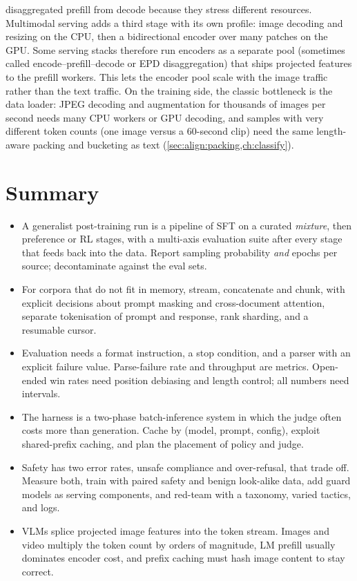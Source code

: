 \begin{systemslens}
 disaggregated prefill from decode because they stress different resources.
Multimodal serving adds a third stage with its own profile: image decoding and resizing on the
CPU, then a bidirectional encoder over many patches on the GPU. Some serving stacks therefore
run encoders as a separate pool (sometimes called encode--prefill--decode or EPD disaggregation)
that ships projected features to the prefill workers. This lets the encoder pool scale with the image traffic
rather than the text traffic. On the training side, the classic bottleneck is the data loader:
JPEG decoding and augmentation for thousands of images per second needs many CPU workers or
GPU decoding, and samples with very different token counts (one image versus a 60-second clip)
need the same length-aware packing and bucketing as text (\cref{sec:align:packing,ch:classify}).
\end{systemslens}

\section{Summary}\label{sec:align:summary}
\begin{itemize}
  \item A generalist post-training run is a pipeline of SFT on a curated \emph{mixture}, then
        preference or RL stages, with a multi-axis evaluation suite after every stage that feeds back
        into the data. Report sampling probability \emph{and} epochs per source; decontaminate
        against the eval sets.
  \item For corpora that do not fit in memory, stream, concatenate and chunk, with explicit
        decisions about prompt masking and cross-document attention, separate tokenisation of prompt
        and response, rank sharding, and a resumable cursor.
  \item Evaluation needs a format instruction, a stop condition, and a parser with an explicit
        failure value. Parse-failure rate and throughput are metrics. Open-ended win rates need
        position debiasing and length control; all numbers need intervals.
  \item The harness is a two-phase batch-inference system in which the judge often costs more
        than generation. Cache by (model, prompt, config), exploit shared-prefix caching, and plan
        the placement of policy and judge.
  \item Safety has two error rates, unsafe compliance and over-refusal, that trade off. Measure
        both, train with paired safety and benign look-alike data, add guard models as serving
        components, and red-team with a taxonomy, varied tactics, and logs.
  \item VLMs splice projected image features into the token stream. Images and video multiply the token
        count by orders of magnitude, LM prefill usually dominates encoder cost, and prefix
        caching must hash image content to stay correct.
\end{itemize}

